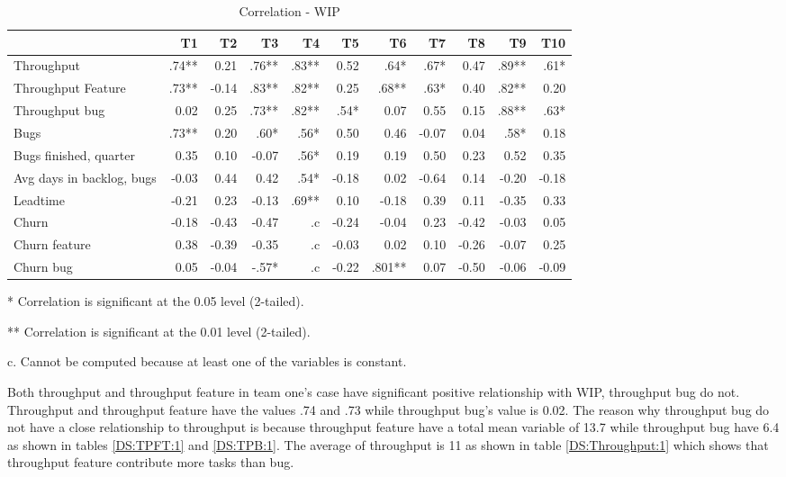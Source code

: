 \documentclass[UKenglish]{ifimaster}  %
\begin{document}
\begin{table}[!htbp]
 \begin{adjustwidth}{-2.5cm}{}
 \centering
 \begin{tabular}{|l|r|r|r|r|r|r|r|r|r|r|}
\hline
 & T1 & T2 & T3 & T4 & T5 & T6 & T7 & T8 & T9 & T10\\ \hline
Throughput &.74**& 0.21& .76**& .83**& 0.52& .64*& .67*& 0.47& .89**& .61*\\ \hline
Throughput Feature &.73**& -0.14& .83**& .82**& 0.25& .68**& .63*& 0.40& .82**& 0.20\\ \hline
Throughput bug &0.02& 0.25& .73**& .82**& .54*& 0.07& 0.55& 0.15& .88**& .63*\\ \hline
Bugs &.73**& 0.20& .60*& .56*& 0.50& 0.46& -0.07& 0.04& .58*& 0.18\\ \hline
Bugs finished, quarter &0.35& 0.10& -0.07& .56*& 0.19& 0.19& 0.50& 0.23& 0.52& 0.35\\ \hline
Avg days in backlog, bugs &-0.03& 0.44& 0.42& .54*& -0.18& 0.02& -0.64& 0.14& -0.20& -0.18\\ \hline
Leadtime &-0.21& 0.23& -0.13& .69**& 0.10& -0.18& 0.39& 0.11& -0.35& 0.33\\ \hline
Churn &-0.18& -0.43& -0.47& .c& -0.24& -0.04& 0.23& -0.42& -0.03& 0.05\\ \hline
Churn feature &0.38& -0.39& -0.35& .c& -0.03& 0.02& 0.10& -0.26& -0.07& 0.25\\ \hline
Churn bug &0.05& -0.04& -.57*
& .c
& -0.22& .801**
& 0.07& -0.50& -0.06& -0.09\\ \hline
\end{tabular}
 \caption{Correlation - WIP}
\label{corr:WIP}
 \centerline {* Correlation is significant at the 0.05 level (2-tailed).}
\centerline{** Correlation is significant at the 0.01 level (2-tailed).}
\centerline{c. Cannot be computed because at least one of the variables is constant.}
\end{adjustwidth}
\end{table}

Both throughput and throughput feature in team one's case have significant positive relationship with WIP, throughput bug do not. Throughput and throughput feature have the values .74 and .73 while throughput bug's value is 0.02. The reason why throughput bug do not have a close relationship to throughput is because throughput feature have a total mean variable of 13.7 while throughput bug have 6.4 as shown in tables \ref{DS:TPFT:1} and \ref{DS:TPB:1}. The average of throughput is 11 as shown in table \ref{DS:Throughput:1} which shows that throughput feature contribute more tasks than bug.
\end{document}
